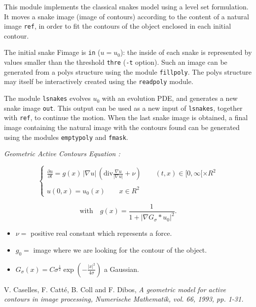 

This module implements the classical snakes model using a
level set formulation. 
It moves a snake image (image of contours) according to the content of a natural image \verb+ref+, in
order to fit the contours of the object enclosed in each initial contour.

The initial snake Fimage is \verb+in+ ($ u = u_0 $): the inside of each
snake is represented by values smaller than the threshold \verb+thre+ 
(\verb+-t+ option).
Such an image can be generated from a polys structure using the module 
\verb+fillpoly+.%
The polys structure may itself be interactively created using the \verb+readpoly+ module. %

The module \verb+lsnakes+ evolves $ u_0 $ with an evolution PDE,
and generates a new snake image \verb+out+.
This output can be used as a new input of \verb+lsnakes+, together with
\verb+ref+, to continue the motion.
When the last snake image is obtained, a final image containing the natural
image with the contours found can be generated using the modules
\verb+emptypoly+ and \verb+fmask+.

\vspace{1cm}

{\em Geometric Active Contours Equation :} 
  
  $$
    \left\{
    \begin{array}{ll}
\displaystyle
    \frac {\partial u}{\partial t} = g(x) \, |\nabla u|\,
\left(\mathrm{div}\frac{\nabla u}{|\nabla u|} + \nu\right) \qquad  
    (t,x) \in {[0,\infty[ \times R^2} \\
\\
    u(0,x) = u_0(x) \qquad 
    x\in{R^2}
    \end{array}     
    \right.
  $$

$$ \mathrm{with}\quad
g(x) = \frac{1}{1+|\nabla G_\sigma \ast u_0|^2}.$$
     
\begin{itemize}
\item $ \nu = $ positive real constant which represents a force.
\item $ g_0 = $ image where we are looking for the contour of the object. 
\item $ G_\sigma(x) = C\sigma^\frac{1}{2}\exp(-\frac{|x|^2}{4\sigma}) $ a Gaussian. 
\end{itemize}
   

%


\begin{thebibliography}{1}
 V. Caselles, F. Catt\'e, B. Coll and F. Dibos, \em{A geometric model for active contours in image processing}, Numerische Mathematik, vol. 66, 1993, pp. 1-31.
\end{thebibliography}

